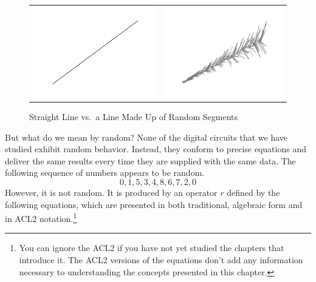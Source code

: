 \begin{figure}
\begin{center}
\begin{tabular}{ll}
\includegraphics[scale=0.3]{images/straight-line.png} &
\includegraphics[scale=0.3]{images/random-line-art.png} \\
\end{tabular}
\end{center}
\caption{Straight Line vs.~a Line Made Up of Random Segments}
\label{fig:line-art}
\end{figure}

But what do we mean by random?
None of the digital circuits
that we have studied exhibit random behavior.
Instead, they conform to precise equations and deliver the same
results every time they are supplied with the same data.
The following sequence of numbers appears to be random.
$$0, 1, 5, 3, 4, 8, 6, 7, 2, 0$$
However, it is not random. It is produced by an
operator $r$ defined by the following equations,
which are presented in both traditional, algebraic form
and in ACL2 notation.\footnote{You can ignore the ACL2
if you have not yet studied the chapters that introduce it.
The ACL2 versions of the equations don't add any information
necessary to understanding the concepts presented in this chapter.}

